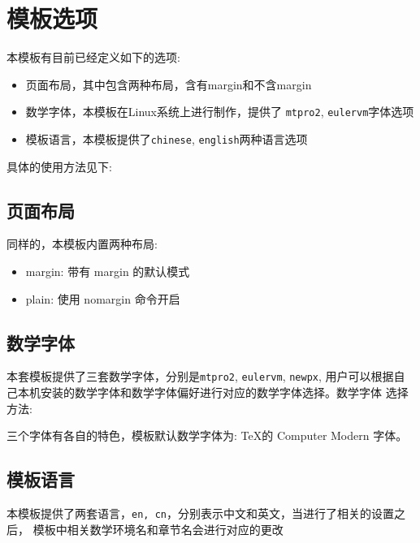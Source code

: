 \section{模板选项}
本模板有目前已经定义如下的选项:
\begin{itemize}
    \item 页面布局，其中包含两种布局，含有margin和不含margin
    \item 数学字体，本模板在Linux系统上进行制作，提供了 \verb|mtpro2|, \verb|eulervm|字体选项
    \item 模板语言，本模板提供了\verb|chinese|, \verb|english|两种语言选项
\end{itemize}
具体的使用方法见下:

\subsection{页面布局}
同样的，本模板内置两种布局:
\begin{itemize}
    \item margin: 带有 margin 的默认模式
    \item plain: 使用 nomargin 命令开启
\end{itemize}


\subsection{数学字体}
本套模板提供了三套数学字体，分别是\verb|mtpro2|, \verb|eulervm|, \verb|newpx|,
用户可以根据自己本机安装的数学字体和数学字体偏好进行对应的数学字体选择。数学字体
选择方法:

三个字体有各自的特色，模板默认数学字体为: \TeX{}的 Computer Modern 字体。



\subsection{模板语言}
本模板提供了两套语言，\verb|en, cn|，分别表示中文和英文，当进行了相关的设置之后，
模板中相关数学环境名和章节名会进行对应的更改



